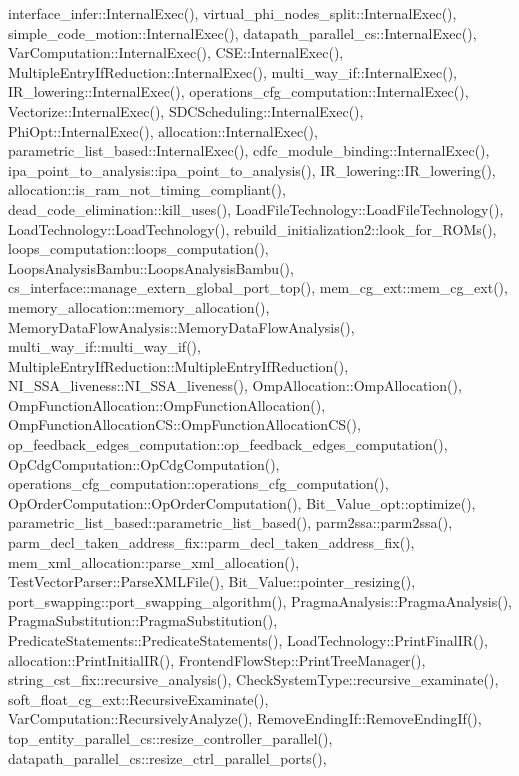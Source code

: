 interface\+\_\+infer\+::\+Internal\+Exec(), virtual\+\_\+phi\+\_\+nodes\+\_\+split\+::\+Internal\+Exec(), simple\+\_\+code\+\_\+motion\+::\+Internal\+Exec(), datapath\+\_\+parallel\+\_\+cs\+::\+Internal\+Exec(), Var\+Computation\+::\+Internal\+Exec(), C\+S\+E\+::\+Internal\+Exec(), Multiple\+Entry\+If\+Reduction\+::\+Internal\+Exec(), multi\+\_\+way\+\_\+if\+::\+Internal\+Exec(), I\+R\+\_\+lowering\+::\+Internal\+Exec(), operations\+\_\+cfg\+\_\+computation\+::\+Internal\+Exec(), Vectorize\+::\+Internal\+Exec(), S\+D\+C\+Scheduling\+::\+Internal\+Exec(), Phi\+Opt\+::\+Internal\+Exec(), allocation\+::\+Internal\+Exec(), parametric\+\_\+list\+\_\+based\+::\+Internal\+Exec(), cdfc\+\_\+module\+\_\+binding\+::\+Internal\+Exec(), ipa\+\_\+point\+\_\+to\+\_\+analysis\+::ipa\+\_\+point\+\_\+to\+\_\+analysis(), I\+R\+\_\+lowering\+::\+I\+R\+\_\+lowering(), allocation\+::is\+\_\+ram\+\_\+not\+\_\+timing\+\_\+compliant(), dead\+\_\+code\+\_\+elimination\+::kill\+\_\+uses(), Load\+File\+Technology\+::\+Load\+File\+Technology(), Load\+Technology\+::\+Load\+Technology(), rebuild\+\_\+initialization2\+::look\+\_\+for\+\_\+\+R\+O\+Ms(), loops\+\_\+computation\+::loops\+\_\+computation(), Loops\+Analysis\+Bambu\+::\+Loops\+Analysis\+Bambu(), cs\+\_\+interface\+::manage\+\_\+extern\+\_\+global\+\_\+port\+\_\+top(), mem\+\_\+cg\+\_\+ext\+::mem\+\_\+cg\+\_\+ext(), memory\+\_\+allocation\+::memory\+\_\+allocation(), Memory\+Data\+Flow\+Analysis\+::\+Memory\+Data\+Flow\+Analysis(), multi\+\_\+way\+\_\+if\+::multi\+\_\+way\+\_\+if(), Multiple\+Entry\+If\+Reduction\+::\+Multiple\+Entry\+If\+Reduction(), N\+I\+\_\+\+S\+S\+A\+\_\+liveness\+::\+N\+I\+\_\+\+S\+S\+A\+\_\+liveness(), Omp\+Allocation\+::\+Omp\+Allocation(), Omp\+Function\+Allocation\+::\+Omp\+Function\+Allocation(), Omp\+Function\+Allocation\+C\+S\+::\+Omp\+Function\+Allocation\+C\+S(), op\+\_\+feedback\+\_\+edges\+\_\+computation\+::op\+\_\+feedback\+\_\+edges\+\_\+computation(), Op\+Cdg\+Computation\+::\+Op\+Cdg\+Computation(), operations\+\_\+cfg\+\_\+computation\+::operations\+\_\+cfg\+\_\+computation(), Op\+Order\+Computation\+::\+Op\+Order\+Computation(), Bit\+\_\+\+Value\+\_\+opt\+::optimize(), parametric\+\_\+list\+\_\+based\+::parametric\+\_\+list\+\_\+based(), parm2ssa\+::parm2ssa(), parm\+\_\+decl\+\_\+taken\+\_\+address\+\_\+fix\+::parm\+\_\+decl\+\_\+taken\+\_\+address\+\_\+fix(), mem\+\_\+xml\+\_\+allocation\+::parse\+\_\+xml\+\_\+allocation(), Test\+Vector\+Parser\+::\+Parse\+X\+M\+L\+File(), Bit\+\_\+\+Value\+::pointer\+\_\+resizing(), port\+\_\+swapping\+::port\+\_\+swapping\+\_\+algorithm(), Pragma\+Analysis\+::\+Pragma\+Analysis(), Pragma\+Substitution\+::\+Pragma\+Substitution(), Predicate\+Statements\+::\+Predicate\+Statements(), Load\+Technology\+::\+Print\+Final\+I\+R(), allocation\+::\+Print\+Initial\+I\+R(), Frontend\+Flow\+Step\+::\+Print\+Tree\+Manager(), string\+\_\+cst\+\_\+fix\+::recursive\+\_\+analysis(), Check\+System\+Type\+::recursive\+\_\+examinate(), soft\+\_\+float\+\_\+cg\+\_\+ext\+::\+Recursive\+Examinate(), Var\+Computation\+::\+Recursively\+Analyze(), Remove\+Ending\+If\+::\+Remove\+Ending\+If(), top\+\_\+entity\+\_\+parallel\+\_\+cs\+::resize\+\_\+controller\+\_\+parallel(), datapath\+\_\+parallel\+\_\+cs\+::resize\+\_\+ctrl\+\_\+parallel\+\_\+ports(), 